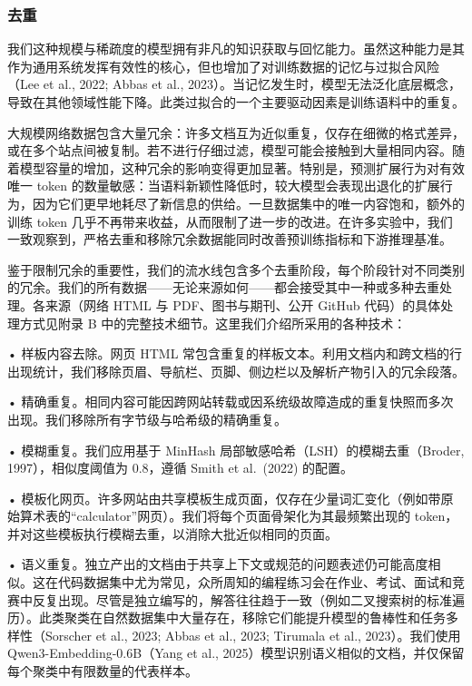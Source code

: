 \documentclass[
  10
]{article}
\begin{document}
\subsubsection{去重}\label{deduplication}

我们这种规模与稀疏度的模型拥有非凡的知识获取与回忆能力。虽然这种能力是其作为通用系统发挥有效性的核心，但也增加了对训练数据的记忆与过拟合风险（Lee et al., 2022; Abbas et al., 2023）。当记忆发生时，模型无法泛化底层概念，导致在其他领域性能下降。此类过拟合的一个主要驱动因素是训练语料中的重复。

大规模网络数据包含大量冗余：许多文档互为近似重复，仅存在细微的格式差异，或在多个站点间被复制。若不进行仔细过滤，模型可能会接触到大量相同内容。随着模型容量的增加，这种冗余的影响变得更加显著。特别是，预测扩展行为对有效唯一 token 的数量敏感：当语料新颖性降低时，较大模型会表现出退化的扩展行为，因为它们更早地耗尽了新信息的供给。一旦数据集中的唯一内容饱和，额外的训练 token 几乎不再带来收益，从而限制了进一步的改进。在许多实验中，我们一致观察到，严格去重和移除冗余数据能同时改善预训练指标和下游推理基准。

鉴于限制冗余的重要性，我们的流水线包含多个去重阶段，每个阶段针对不同类别的冗余。我们的所有数据——无论来源如何——都会接受其中一种或多种去重处理。各来源（网络 HTML 与 PDF、图书与期刊、公开 GitHub 代码）的具体处理方式见附录 B 中的完整技术细节。这里我们介绍所采用的各种技术：

• 样板内容去除。网页 HTML 常包含重复的样板文本。利用文档内和跨文档的行出现统计，我们移除页眉、导航栏、页脚、侧边栏以及解析产物引入的冗余段落。

• 精确重复。相同内容可能因跨网站转载或因系统级故障造成的重复快照而多次出现。我们移除所有字节级与哈希级的精确重复。

• 模糊重复。我们应用基于 MinHash 局部敏感哈希（LSH）的模糊去重（Broder, 1997），相似度阈值为 0.8，遵循 Smith et al.~(2022) 的配置。

• 模板化网页。许多网站由共享模板生成页面，仅存在少量词汇变化（例如带原始算术表的“calculator”网页）。我们将每个页面骨架化为其最频繁出现的 token，并对这些模板执行模糊去重，以消除大批近似相同的页面。

• 语义重复。独立产出的文档由于共享上下文或规范的问题表述仍可能高度相似。这在代码数据集中尤为常见，众所周知的编程练习会在作业、考试、面试和竞赛中反复出现。尽管是独立编写的，解答往往趋于一致（例如二叉搜索树的标准遍历）。此类聚类在自然数据集中大量存在，移除它们能提升模型的鲁棒性和任务多样性（Sorscher et al., 2023; Abbas et al., 2023; Tirumala et al., 2023）。我们使用 Qwen3-Embedding-0.6B（Yang et al., 2025）模型识别语义相似的文档，并仅保留每个聚类中有限数量的代表样本。
\end{document}
